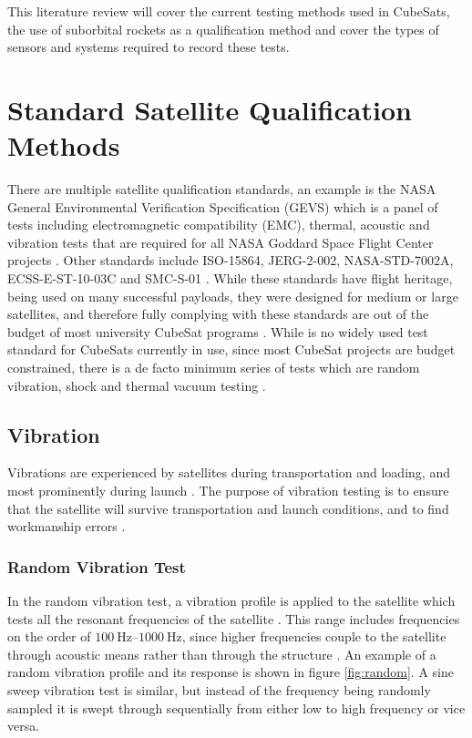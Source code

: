 \documentclass{report}
\begin{document}
This literature review will cover the current testing methods used in CubeSats, the use of suborbital rockets as a qualification method and cover the types of sensors and systems required to record these tests.

\section{Standard Satellite Qualification Methods}
There are multiple satellite qualification standards, an example is the NASA General Environmental Verification Specification (GEVS) which is a panel of tests including electromagnetic compatibility (EMC), thermal, acoustic and vibration tests that are required for all NASA Goddard Space Flight Center projects \cite{nasa-gevs}. Other standards include ISO-15864, JERG-2-002, NASA-STD-7002A, ECSS-E-ST-10-03C and SMC-S-01 \cite{cho2012overview}. While these standards have flight heritage, being used on many successful payloads, they were designed for medium or large satellites, and therefore fully complying with these standards are out of the budget of most university CubeSat programs \cite{cho2012overview}. While is no widely used test standard for CubeSats currently in use, since most CubeSat projects are budget constrained, there is a de facto minimum series of tests which are random vibration, shock and thermal vacuum testing \cite{welle2020overview}.


\subsection{Vibration}
Vibrations are experienced by satellites during transportation and loading, and most prominently during launch \cite{brown_elements_2002}. The purpose of vibration testing is to ensure that the satellite will survive transportation and launch conditions, and to find workmanship errors \cite{brown_elements_2002,gordon2015benefits}.

\subsubsection{Random Vibration Test}
In the random vibration test, a vibration profile is applied to the satellite which tests all the resonant frequencies of the satellite \cite{nieto2019cubesat}. This range includes frequencies on the order of $\SIrange{100}{1000}{\hertz}$, since higher frequencies couple to the satellite through acoustic means rather than through the structure \cite{gordon2015benefits}. An example of a random vibration profile and its response is shown in figure \ref{fig:random}. A sine sweep vibration test is similar, but instead of the frequency being randomly sampled it is swept through sequentially from either low to high frequency or vice versa.
\end{document}

